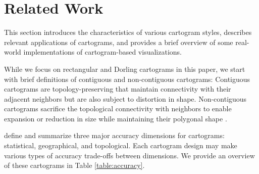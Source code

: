 \section{Related Work}

This section introduces the characteristics of various cartogram styles, describes relevant applications of cartograms, and provides a brief overview of some real-world implementations of cartogram-based visualizations.

While we focus on rectangular and Dorling cartograms in this paper, we start with brief definitions of contiguous and non-contiguous cartograms: Contiguous cartograms are topology-preserving that maintain connectivity with their adjacent neighbors but are also subject to distortion in shape. Non-contiguous cartograms sacrifice the topological connectivity with neighbors to enable expansion or reduction in size while maintaining their polygonal shape \cite{dent2009Cartography}.

 define and summarize three major accuracy dimensions for cartograms: statistical, geographical, and topological. Each cartogram design may make various types of accuracy trade-offs between dimensions. We provide an overview of these cartograms in Table \ref{table:accuracy}.


{
\renewcommand{\arraystretch}{1.5}
\begin{table}[!tb]
	\centering
	\caption{ Trade-off between dimensions.  Dimension sacrificed in order to improve  target dimension's accuracy.}
	\label{table:accuracy}
\end{table}
}


